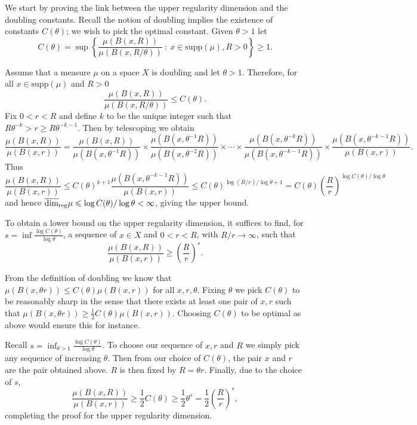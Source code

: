 We start by proving the link between the upper regularity dimension and the doubling constants. Recall the notion of doubling implies the existence of constants $C(\theta)$; we wish to pick the optimal constant. Given $\theta > 1$ let
\[
C(\theta) = \sup \left\{ \frac{\mu(B(x,R))}{\mu(B(x,R/\theta))} \ : \ x \in \text{supp}(\mu), R>0 \right\} \geq 1.
\]

Assume that a measure $\mu$ on a space $X$ is doubling and let $\theta > 1$.  Therefore, for all $x \in \text{supp}(\mu)$ and $R>0$
\[
\frac{\mu(B(x,R))}{\mu(B(x,R/\theta))} \le C(\theta).
\]
Fix  $0< r < R$ and  define $k$ to be the unique integer such that $R\theta^{-k} > r \ge R\theta^{-k-1}$. Then by telescoping we obtain
\[
\frac{\mu(B(x,R))}{\mu(B(x,r))} = \frac{\mu(B(x,R))}{\mu(B(x,\theta^{-1} R))} \times \frac{\mu(B(x,\theta^{-1} R))}{\mu(B(x,\theta^{-2} R))} \times\cdots \times \frac{\mu(B(x,\theta^{-k} R))}{\mu(B(x,\theta^{-k-1}R))} \times \frac{\mu(B(x,\theta^{-k-1}R))}{\mu(B(x,r))}.
\]
Thus 
\[
\frac{\mu(B(x,R))}{\mu(B(x,r))} \le C(\theta)^{k+1}  \frac{\mu(B(x,\theta^{-k-1}R))}{\mu(B(x,r))} \le C(\theta)^{\log(R/r) / \log \theta+1} = C(\theta) \left(\frac{R}{r} \right)^{\log C(\theta) / \log \theta}
\]
and hence $\overline{\dim}_{\textup{reg}} \mu \leqslant \log C(\theta) / \log \theta < \infty$, giving the upper bound.


To obtain a lower bound on the upper regularity dimension, it suffices to find, for $s = \inf\frac{\log C(\theta)}{\log \theta}$, a sequence of $x\in X$ and $0<r<R$, with $R/r \rightarrow \infty$, such that 
\[
\frac{\mu(B(x,R))}{\mu(B(x,r))} \ge \left(\frac{R}{r}\right)^s.
\]
	
	
From the definition of doubling we know that $\mu(B(x,\theta r) ) \le C(\theta) \mu(B(x,r))$ for all $x,r, \theta$. Fixing $\theta$ we pick $C(\theta)$ to be reasonably sharp in the sense that there exists at least one pair of $x,r$ such that $\mu(B(x,\theta r) ) \ge \frac{1}{2}C(\theta) \mu(B(x,r))$. Choosing $C(\theta)$ to be optimal as above would ensure this for instance.
	
Recall $s = \inf_{\theta > 1}\frac{\log C(\theta)}{\log \theta}$. To choose our sequence of $x,r$ and $R$ we simply pick any sequence of increasing $\theta$. Then from our choice of $C(\theta)$, the pair $x$ and $r$ are the pair obtained above. $R$ is then fixed by $R = \theta r$. Finally, due to the choice of $s$,
\[
\frac{\mu(B(x,R))}{\mu(B(x,r))} \ge \frac{1}{2} C(\theta)  \ge \frac{1}{2}\theta^s = \frac{1}{2}\left(\frac{R}{r} \right)^s,
\]
completing the proof for the upper regularity dimension.
	


